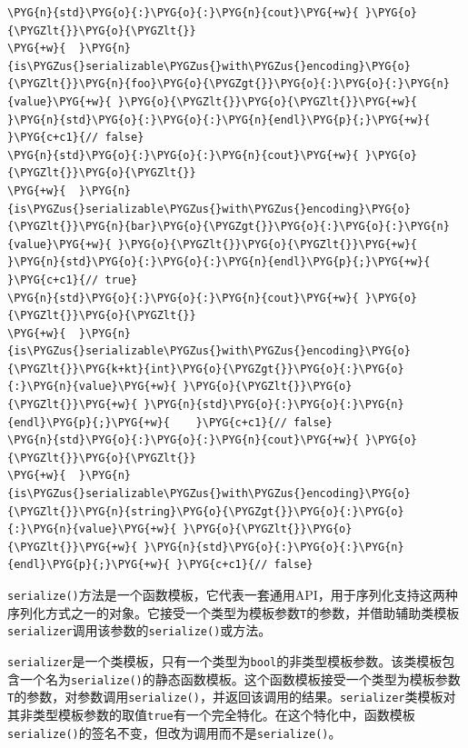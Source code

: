 \begin{codeblockbg}
\begin{Verbatim}[commandchars=\\\{\},breaklines=true,breakanywhere=true,fontsize=\codefont,xleftmargin=17bp]
\PYG{n}{std}\PYG{o}{:}\PYG{o}{:}\PYG{n}{cout}\PYG{+w}{ }\PYG{o}{\PYGZlt{}}\PYG{o}{\PYGZlt{}}
\PYG{+w}{  }\PYG{n}{is\PYGZus{}serializable\PYGZus{}with\PYGZus{}encoding}\PYG{o}{\PYGZlt{}}\PYG{n}{foo}\PYG{o}{\PYGZgt{}}\PYG{o}{:}\PYG{o}{:}\PYG{n}{value}\PYG{+w}{ }\PYG{o}{\PYGZlt{}}\PYG{o}{\PYGZlt{}}\PYG{+w}{ }\PYG{n}{std}\PYG{o}{:}\PYG{o}{:}\PYG{n}{endl}\PYG{p}{;}\PYG{+w}{    }\PYG{c+c1}{// false}
\PYG{n}{std}\PYG{o}{:}\PYG{o}{:}\PYG{n}{cout}\PYG{+w}{ }\PYG{o}{\PYGZlt{}}\PYG{o}{\PYGZlt{}}
\PYG{+w}{  }\PYG{n}{is\PYGZus{}serializable\PYGZus{}with\PYGZus{}encoding}\PYG{o}{\PYGZlt{}}\PYG{n}{bar}\PYG{o}{\PYGZgt{}}\PYG{o}{:}\PYG{o}{:}\PYG{n}{value}\PYG{+w}{ }\PYG{o}{\PYGZlt{}}\PYG{o}{\PYGZlt{}}\PYG{+w}{ }\PYG{n}{std}\PYG{o}{:}\PYG{o}{:}\PYG{n}{endl}\PYG{p}{;}\PYG{+w}{    }\PYG{c+c1}{// true}
\PYG{n}{std}\PYG{o}{:}\PYG{o}{:}\PYG{n}{cout}\PYG{+w}{ }\PYG{o}{\PYGZlt{}}\PYG{o}{\PYGZlt{}}
\PYG{+w}{  }\PYG{n}{is\PYGZus{}serializable\PYGZus{}with\PYGZus{}encoding}\PYG{o}{\PYGZlt{}}\PYG{k+kt}{int}\PYG{o}{\PYGZgt{}}\PYG{o}{:}\PYG{o}{:}\PYG{n}{value}\PYG{+w}{ }\PYG{o}{\PYGZlt{}}\PYG{o}{\PYGZlt{}}\PYG{+w}{ }\PYG{n}{std}\PYG{o}{:}\PYG{o}{:}\PYG{n}{endl}\PYG{p}{;}\PYG{+w}{    }\PYG{c+c1}{// false}
\PYG{n}{std}\PYG{o}{:}\PYG{o}{:}\PYG{n}{cout}\PYG{+w}{ }\PYG{o}{\PYGZlt{}}\PYG{o}{\PYGZlt{}}
\PYG{+w}{  }\PYG{n}{is\PYGZus{}serializable\PYGZus{}with\PYGZus{}encoding}\PYG{o}{\PYGZlt{}}\PYG{n}{string}\PYG{o}{\PYGZgt{}}\PYG{o}{:}\PYG{o}{:}\PYG{n}{value}\PYG{+w}{ }\PYG{o}{\PYGZlt{}}\PYG{o}{\PYGZlt{}}\PYG{+w}{ }\PYG{n}{std}\PYG{o}{:}\PYG{o}{:}\PYG{n}{endl}\PYG{p}{;}\PYG{+w}{ }\PYG{c+c1}{// false}
\end{Verbatim}
\end{codeblockbg}



\texttt{serialize()}方法是一个函数模板，它代表一套通用API，用于序列化支持这两种序列化方式之一的对象。它接受一个类型为模板参数\texttt{T}的参数，并借助辅助类模板\texttt{serializer}调用该参数的\texttt{serialize()}或方法。



\texttt{serializer}是一个类模板，只有一个类型为\texttt{bool}的非类型模板参数。该类模板包含一个名为\texttt{serialize()}的静态函数模板。这个函数模板接受一个类型为模板参数\texttt{T}的参数，对参数调用\texttt{serialize()}，并返回该调用的结果。\texttt{serializer}类模板对其非类型模板参数的取值\texttt{true}有一个完全特化。在这个特化中，函数模板\texttt{serialize()}的签名不变，但改为调用而不是\texttt{serialize()}。


